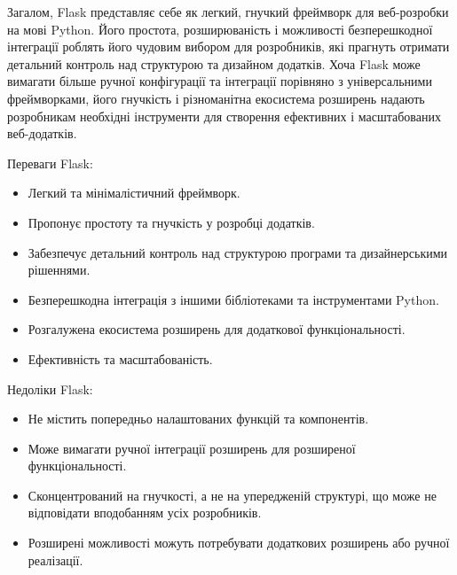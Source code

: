 Загалом, Flask представляє себе як легкий, гнучкий фреймворк для веб-розробки на мові Python. Його простота, розширюваність і можливості безперешкодної інтеграції роблять його чудовим вибором для розробників, які прагнуть отримати детальний контроль над структурою та дизайном додатків. Хоча Flask може вимагати більше ручної конфігурації та інтеграції порівняно з універсальними фреймворками, його гнучкість і різноманітна екосистема розширень надають розробникам необхідні інструменти для створення ефективних і масштабованих веб-додатків.

Переваги Flask:
\begin{itemize}
\item Легкий та мінімалістичний фреймворк.
\item Пропонує простоту та гнучкість у розробці додатків.
\item Забезпечує детальний контроль над структурою програми та дизайнерськими рішеннями.
\item Безперешкодна інтеграція з іншими бібліотеками та інструментами Python.
\item Розгалужена екосистема розширень для додаткової функціональності.
\item Ефективність та масштабованість.
\end{itemize}

Недоліки Flask:
\begin{itemize}
\item Не містить попередньо налаштованих функцій та компонентів.
\item Може вимагати ручної інтеграції розширень для розширеної функціональності.
\item Сконцентрований на гнучкості, а не на упередженій структурі, що може не відповідати вподобанням усіх розробників.
\item Розширені можливості можуть потребувати додаткових розширень або ручної реалізації.
\end{itemize}